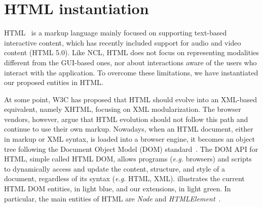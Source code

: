 \section{HTML instantiation}
\label{sec:html}

HTML~\cite{w3c_html_2014} is a markup language mainly focused on supporting
text-based interactive content, which has recently included support for audio
and video content (HTML 5.0). Like NCL, HTML does not focus on representing
modalities different from the GUI-based ones, nor about interactions aware of
the users who interact with the application. To overcome these limitations, we
have instantiated our proposed entities in HTML.

At some point, W3C has proposed that HTML should evolve into an XML-based
equivalent, namely XHTML, focusing on XML modularization. The browser vendors,
however, argue that HTML evolution should not follow this path and continue to
use their own markup\footnotemark. Nowadays, when an HTML document, either in
markup or XML syntax, is loaded into a browser engine, it becomes an object
tree following the Document Object Model (DOM) standard~\cite{w3c_dom4_2015}.
The DOM API for HTML, simple called HTML DOM\footnotemark, allows programs
(\textit{e.g.} browsers) and scripts to dynamically access and update the
content, structure, and style of a document, regardless of its syntax
(\textit{e.g.} HTML, XML).  illustrates the current HTML DOM
entities\footnotemark, in light blue, and our extensions, in light green. In
particular, the main entities of HTML are \textit{Node} and
\textit{HTMLElement}~\cite{mozilla_dom}.


